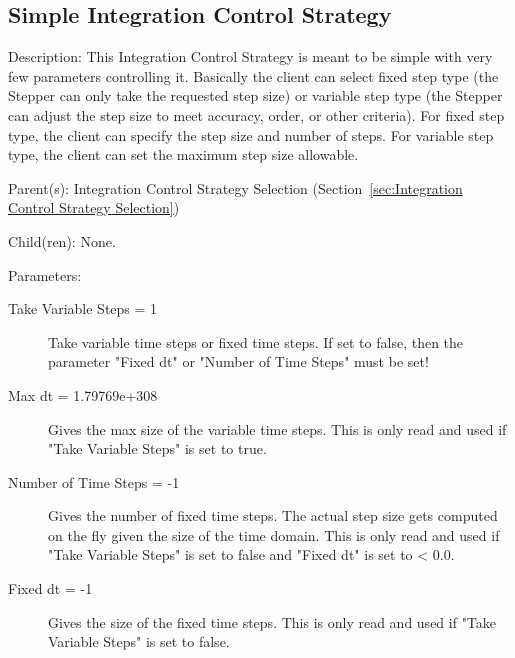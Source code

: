\subsection{Simple Integration Control Strategy}
\label{sec:Simple Integration Control Strategy}

\begin{list}{}
  {\setlength{\leftmargin}{1.0in}
   \setlength{\labelwidth}{0.75in}
   \setlength{\labelsep}{0.125in}}
  \item[Description:]
    This Integration Control Strategy is meant to be simple with very few parameters controlling it.  Basically the client can select fixed step type (the Stepper can only take the requested step size) or variable step type (the Stepper can adjust the step size to meet accuracy, order, or other criteria).  For fixed step type, the client can specify the step size and number of steps. For variable step type, the client can set the maximum step size allowable.
  \item[Parent(s):]
    Integration Control Strategy Selection (Section~\ref{sec:Integration Control Strategy Selection})
  \item[Child(ren):]
    None. 
  \item[Parameters:]
    \begin{description}
      \item[Take Variable Steps = 1] 
Take variable time steps or fixed time steps.
If set to false, then the parameter "Fixed dt"
or "Number of Time Steps" must be set!
      \item[Max dt = 1.79769e+308] 
Gives the max size of the variable time steps.  This is only read and used if
"Take Variable Steps" is set to true.
      \item[Number of Time Steps = -1] 
Gives the number of fixed time steps.  The actual step size gets computed
on the fly given the size of the time domain.
This is only read and used if "Take Variable Steps" is set to false
and "Fixed dt" is set to < 0.0.
      \item[Fixed dt = -1] 
Gives the size of the fixed time steps.  This is only read and used if
"Take Variable Steps" is set to false.
\end{description}

\end{list}

